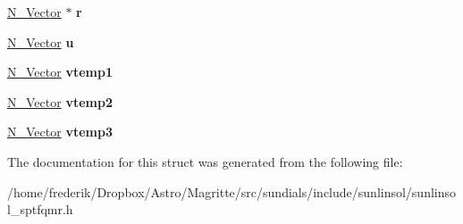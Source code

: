 \begin{DoxyCompactItemize}
\item 
\mbox{\label{struct__SUNLinearSolverContent__SPTFQMR_aa0e78f5bd8bdac85a3326204999dc9bb}} 
\mbox{\hyperlink{struct__generic__N__Vector}{N\+\_\+\+Vector}} $\ast$ {\bfseries r}
\item 
\mbox{\label{struct__SUNLinearSolverContent__SPTFQMR_a913151e052f0b79c6224010297d63a2f}} 
\mbox{\hyperlink{struct__generic__N__Vector}{N\+\_\+\+Vector}} {\bfseries u}
\item 
\mbox{\label{struct__SUNLinearSolverContent__SPTFQMR_adaaffd387b337f4b565e4ae13c17891f}} 
\mbox{\hyperlink{struct__generic__N__Vector}{N\+\_\+\+Vector}} {\bfseries vtemp1}
\item 
\mbox{\label{struct__SUNLinearSolverContent__SPTFQMR_ad247b6d60f30da57378738d32f923459}} 
\mbox{\hyperlink{struct__generic__N__Vector}{N\+\_\+\+Vector}} {\bfseries vtemp2}
\item 
\mbox{\label{struct__SUNLinearSolverContent__SPTFQMR_a112e189316bc210438bedea0ad17c22c}} 
\mbox{\hyperlink{struct__generic__N__Vector}{N\+\_\+\+Vector}} {\bfseries vtemp3}
\end{DoxyCompactItemize}


The documentation for this struct was generated from the following file\+:\begin{DoxyCompactItemize}
\item 
/home/frederik/\+Dropbox/\+Astro/\+Magritte/src/sundials/include/sunlinsol/sunlinsol\+\_\+sptfqmr.\+h\end{DoxyCompactItemize}
